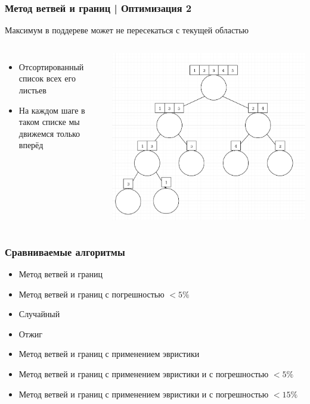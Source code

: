 \documentclass{beamer}
\begin{document}
\begin{frame} \frametitle{Метод ветвей и границ | Оптимизация 2}
    Максимум в поддереве может не пересекаться с текущей областью

    \begin{columns}
            \begin{itemize}
                \item Отсортированный список всех его листьев
                \item На каждом шаге в таком списке мы движемся только вперёд
            \end{itemize}
            \includegraphics[width=1.1\textwidth]{merge.png}
    \end{columns}
\end{frame}

\begin{frame} \frametitle{Сравниваемые алгоритмы}
    \begin{itemize}
        \item Метод ветвей и границ 
        \item Метод ветвей и границ с погрешностью $<5\%$
        \item Случайный
        \item Отжиг
        \item Метод ветвей и границ с применением эвристики
        \item Метод ветвей и границ с применением эвристики и с погрешностью $<5\%$
        \item Метод ветвей и границ с применением эвристики и с погрешностью $<15\%$
    \end{itemize}
\end{frame}
\end{document}
